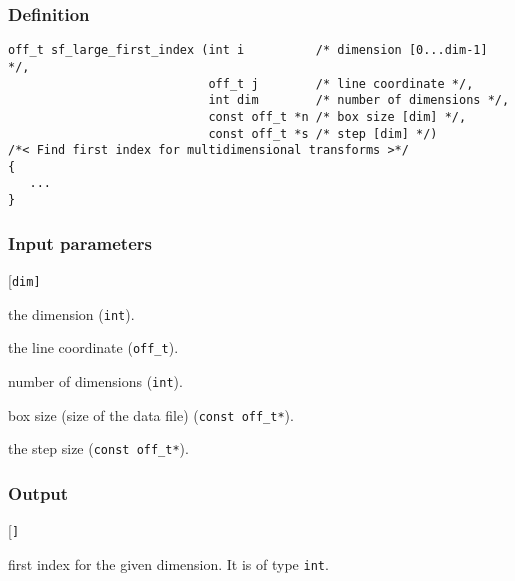 \subsubsection*{Definition}
\begin{verbatim}
off_t sf_large_first_index (int i          /* dimension [0...dim-1] */, 
                            off_t j        /* line coordinate */, 
                            int dim        /* number of dimensions */, 
                            const off_t *n /* box size [dim] */, 
                            const off_t *s /* step [dim] */)
/*< Find first index for multidimensional transforms >*/
{
   ...    
}
\end{verbatim}


\subsubsection*{Input parameters}
\begin{desclist}{\tt }{\quad}[\tt dim]
   \setlength\itemsep{0pt}
   \item[i ]  the dimension (\texttt{int}). 
   \item[j]   the line coordinate (\texttt{off\_t}). 
   \item[dim] number of dimensions (\texttt{int}). 
   \item[n]   box size (size of the data file) (\texttt{const off\_t*}).  
   \item[s]   the step size (\texttt{const off\_t*}).  
\end{desclist}

\subsubsection*{Output}
\begin{desclist}{\tt }{\quad}[\tt ]
   \setlength\itemsep{0pt}
   \item[i0] first index for the given dimension. It is of type \texttt{int}.
\end{desclist}




